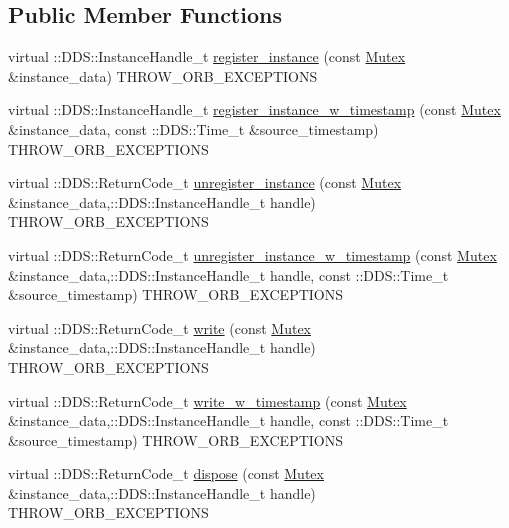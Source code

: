 \subsection*{Public Member Functions}
\begin{DoxyCompactItemize}
\item 
virtual ::DDS::InstanceHandle\_\-t \hyperlink{classKnowledge_1_1MutexDataWriter__impl_a4a4e228d4395b2572c05ead40e90a7e4}{register\_\-instance} (const \hyperlink{structKnowledge_1_1Mutex}{Mutex} \&instance\_\-data) THROW\_\-ORB\_\-EXCEPTIONS
\item 
virtual ::DDS::InstanceHandle\_\-t \hyperlink{classKnowledge_1_1MutexDataWriter__impl_a90d70ecf8c4341b40c9ed7f81eff48df}{register\_\-instance\_\-w\_\-timestamp} (const \hyperlink{structKnowledge_1_1Mutex}{Mutex} \&instance\_\-data, const ::DDS::Time\_\-t \&source\_\-timestamp) THROW\_\-ORB\_\-EXCEPTIONS
\item 
virtual ::DDS::ReturnCode\_\-t \hyperlink{classKnowledge_1_1MutexDataWriter__impl_a54630d11385c9b52e0fa68bc511574b2}{unregister\_\-instance} (const \hyperlink{structKnowledge_1_1Mutex}{Mutex} \&instance\_\-data,::DDS::InstanceHandle\_\-t handle) THROW\_\-ORB\_\-EXCEPTIONS
\item 
virtual ::DDS::ReturnCode\_\-t \hyperlink{classKnowledge_1_1MutexDataWriter__impl_a1910edfda2e0efbe26f39e9118f544d5}{unregister\_\-instance\_\-w\_\-timestamp} (const \hyperlink{structKnowledge_1_1Mutex}{Mutex} \&instance\_\-data,::DDS::InstanceHandle\_\-t handle, const ::DDS::Time\_\-t \&source\_\-timestamp) THROW\_\-ORB\_\-EXCEPTIONS
\item 
virtual ::DDS::ReturnCode\_\-t \hyperlink{classKnowledge_1_1MutexDataWriter__impl_a060f929e998f7dd5a986431b6dad2469}{write} (const \hyperlink{structKnowledge_1_1Mutex}{Mutex} \&instance\_\-data,::DDS::InstanceHandle\_\-t handle) THROW\_\-ORB\_\-EXCEPTIONS
\item 
virtual ::DDS::ReturnCode\_\-t \hyperlink{classKnowledge_1_1MutexDataWriter__impl_a85720e6c16da683f39ba2d89effe41f5}{write\_\-w\_\-timestamp} (const \hyperlink{structKnowledge_1_1Mutex}{Mutex} \&instance\_\-data,::DDS::InstanceHandle\_\-t handle, const ::DDS::Time\_\-t \&source\_\-timestamp) THROW\_\-ORB\_\-EXCEPTIONS
\item 
virtual ::DDS::ReturnCode\_\-t \hyperlink{classKnowledge_1_1MutexDataWriter__impl_a1c06c7357d39487fad80f816127fcb08}{dispose} (const \hyperlink{structKnowledge_1_1Mutex}{Mutex} \&instance\_\-data,::DDS::InstanceHandle\_\-t handle) THROW\_\-ORB\_\-EXCEPTIONS
\item 

\end{DoxyCompactItemize}
